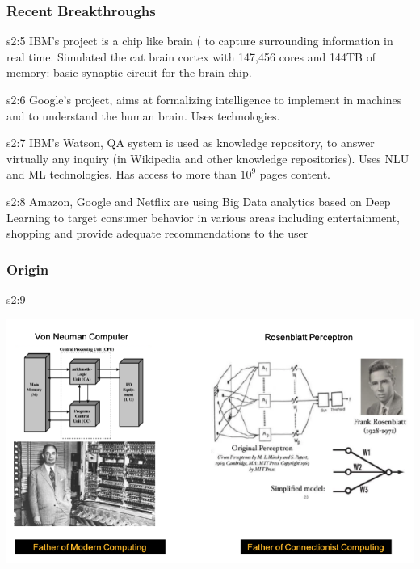 \documentclass{tron}
\begin{document}
\subsubsection{Recent Breakthroughs}
\begin{example}{s2:5}
	IBM’s  project is a chip like brain ( to capture surrounding information in real time. Simulated the cat brain cortex with 147,456 cores and 144TB of memory: basic synaptic circuit for the brain chip.\\
\end{example}
\begin{example}{s2:6}
	Google’s  project, aims at formalizing intelligence to implement in machines and to understand the human brain. Uses  technologies.\\
\end{example}
\begin{example}{s2:7}
	IBM’s Watson, QA system is used as knowledge repository, to answer virtually any inquiry (in Wikipedia and other knowledge repositories). Uses NLU and ML technologies. Has access to more than $10^9$ pages content.\\
\end{example}
\begin{example}{s2:8}
	Amazon, Google and Netflix are using Big Data analytics based on Deep Learning to target consumer behavior in various areas including entertainment, shopping and provide adequate recommendations to the user
\end{example}

%
\subsubsection{Origin}
\begin{alert}{s2:9}
	\begin{center}
		\includegraphics[width=0.8\columnwidth]{Figs/Slide2/origin.png}		
	\end{center}
\end{alert}
\end{document}
